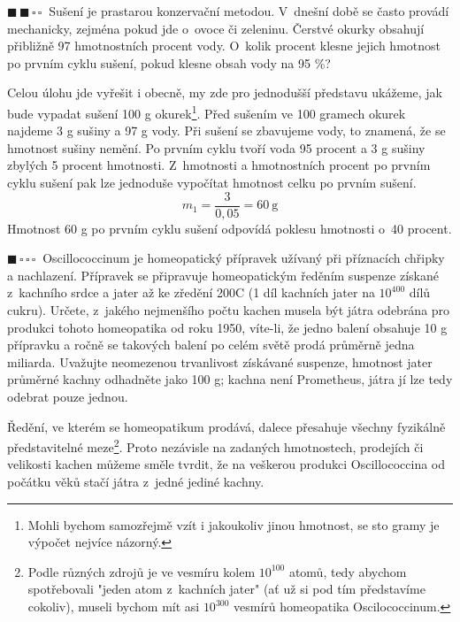 \documentclass{book}
\newcommand{\jeden}{$\blacksquare \, \square \, \square \, \square \; \; $}
\newcommand{\dva}{$\blacksquare \, \blacksquare \, \square \, \square \; \; $}
\renewenvironment{quotation}{\par}{\par} %
\begin{document}
\hrulefill %
\begin{quotation}
\dva Sušení je prastarou konzervační metodou. V~dnešní době se často provádí
mechanicky, zejména pokud jde o~ovoce či zeleninu. Čerstvé okurky
obsahují přibližně 97 hmotnostních procent vody. O~kolik procent klesne
jejich hmotnost po prvním cyklu sušení, pokud klesne obsah vody na
95 \%?
\end{quotation} \dotfill \par 
Celou úlohu jde vyřešit i obecně, my zde pro jednodušší představu ukážeme, jak bude vypadat sušení 100 g okurek\footnote{Mohli bychom samozřejmě vzít i jakoukoliv jinou hmotnost, se sto gramy je výpočet nejvíce názorný.}. Před sušením ve 100 gramech okurek najdeme 3 g sušiny a 97 g vody.
Při sušení se zbavujeme vody, to znamená, že se hmotnost sušiny nemění. Po prvním cyklu tvoří voda 95 procent a 3 g sušiny zbylých 5 procent hmotnosti. Z~hmotnosti a hmotnostních procent po prvním cyklu sušení pak lze jednoduše vypočítat hmotnost celku po prvním sušení. 
\[
m_1 =\frac{3}{0,05}=\SI{60}{\gram}
\]
Hmotnost 60 g po prvním cyklu sušení odpovídá poklesu hmotnosti o~40 procent.

\newpage %

\begin{quotation}
\jeden Oscillococcinum\textsuperscript{\textregistered} je homeopatický přípravek užívaný při
příznacích chřipky a nachlazení. Přípravek se připravuje homeopatickým
ředěním suspenze získané z~kachního srdce a jater až ke zředění 200C
(1 díl kachních jater na $10^{400}$ dílů cukru). Určete, z~jakého
nejmenšího počtu kachen musela být játra odebrána pro produkci tohoto
homeopatika od roku 1950, víte-li, že jedno balení obsahuje 10 g přípravku
a ročně se takových balení po celém světě prodá průměrně jedna miliarda.
Uvažujte neomezenou trvanlivost získávané suspenze, hmotnost jater
průměrné kachny odhadněte jako 100 g; kachna není Prometheus, játra
jí lze tedy odebrat pouze jednou.
\end{quotation} \dotfill \par 
Ředění, ve kterém se homeopatikum prodává, dalece přesahuje všechny
fyzikálně představitelné meze\footnote{Podle různých zdrojů je ve vesmíru kolem $10^{100}$ atomů, tedy abychom
spotřebovali "jeden atom z~kachních jater" (ať už si pod tím představíme cokoliv), museli bychom mít asi $10^{300}$
vesmírů homeopatika Oscilococcinum.}. Proto nezávisle na zadaných hmotnostech, prodejích či velikosti kachen
můžeme směle tvrdit, že na veškerou produkci Oscillococcina\textsuperscript{\textregistered} od počátku věků stačí játra z~jedné jediné kachny.
\end{document}
